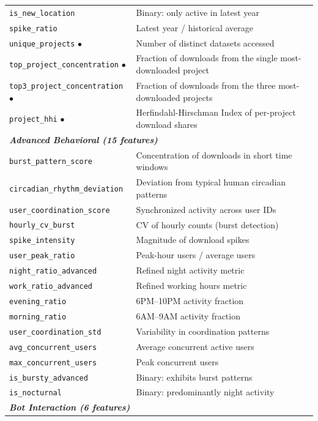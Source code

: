 \documentclass[11pt,a4paper]{article}
\begin{document}
\begin{longtable}{p{5.2cm}p{9.3cm}}
\texttt{is\_new\_location} & Binary: only active in latest year \\
\texttt{spike\_ratio} & Latest year / historical average \\
\texttt{unique\_projects} $\bullet$ & Number of distinct datasets accessed \\
\texttt{top\_project\_concentration} $\bullet$ & Fraction of downloads from the single most-downloaded project \\
\texttt{top3\_project\_concentration} $\bullet$ & Fraction of downloads from the three most-downloaded projects \\
\texttt{project\_hhi} $\bullet$ & Herfindahl-Hirschman Index of per-project download shares \\
\midrule
\multicolumn{2}{l}{\textit{\textbf{Advanced Behavioral (15 features)}}} \\
\texttt{burst\_pattern\_score} & Concentration of downloads in short time windows \\
\texttt{circadian\_rhythm\_deviation} & Deviation from typical human circadian patterns \\
\texttt{user\_coordination\_score} & Synchronized activity across user IDs \\
\texttt{hourly\_cv\_burst} & CV of hourly counts (burst detection) \\
\texttt{spike\_intensity} & Magnitude of download spikes \\
\texttt{user\_peak\_ratio} & Peak-hour users / average users \\
\texttt{night\_ratio\_advanced} & Refined night activity metric \\
\texttt{work\_ratio\_advanced} & Refined working hours metric \\
\texttt{evening\_ratio} & 6PM--10PM activity fraction \\
\texttt{morning\_ratio} & 6AM--9AM activity fraction \\
\texttt{user\_coordination\_std} & Variability in coordination patterns \\
\texttt{avg\_concurrent\_users} & Average concurrent active users \\
\texttt{max\_concurrent\_users} & Peak concurrent users \\
\texttt{is\_bursty\_advanced} & Binary: exhibits burst patterns \\
\texttt{is\_nocturnal} & Binary: predominantly night activity \\
\midrule
\multicolumn{2}{l}{\textit{\textbf{Bot Interaction (6 features)}}} \\

\end{longtable}
\end{document}
